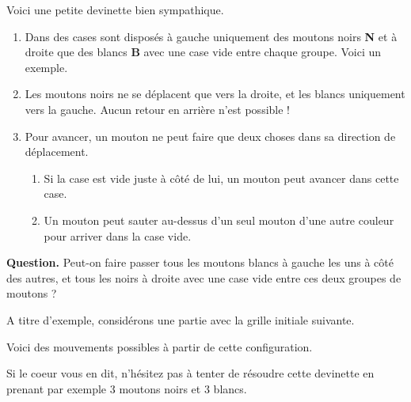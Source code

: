 Voici une petite devinette bien sympathique.

\begin{enumerate}
	\item Dans des cases sont disposés à gauche uniquement des moutons noirs \textbf{N} et à droite que des blancs \textbf{B} avec une case vide entre chaque groupe. Voici un exemple.


	\item Les moutons noirs ne se déplacent que vers la droite, et les blancs uniquement vers la gauche. Aucun retour en arrière n'est possible !


	\item Pour avancer, un mouton ne peut faire que deux choses dans sa direction de déplacement.
	\begin{enumerate}
		\item Si la case est vide juste à côté de lui, un mouton peut avancer dans cette case.

		\item Un mouton peut sauter au-dessus d'un seul mouton d'une autre couleur pour arriver dans la case vide.
	\end{enumerate}
\end{enumerate}

\textbf{Question.} Peut-on faire passer tous les moutons blancs à gauche les uns à côté des autres, et tous les noirs à droite avec une case vide entre ces deux groupes de moutons ?


\bigskip


A titre d'exemple, considérons une partie avec la grille initiale suivante.


Voici des mouvements possibles à partir de cette configuration.

\medskip

\begin{mvts}
	\item {}

	\medskip
	\item {}
		  
	\medskip
	\item {}
		  
	\medskip
	\item {}
		  
	\medskip
	\item {}
		  
	\medskip
	\item {}
\end{mvts}

Si le coeur vous en dit, n'hésitez pas à tenter de résoudre cette devinette en prenant par exemple $3$ moutons noirs et $3$ blancs.
